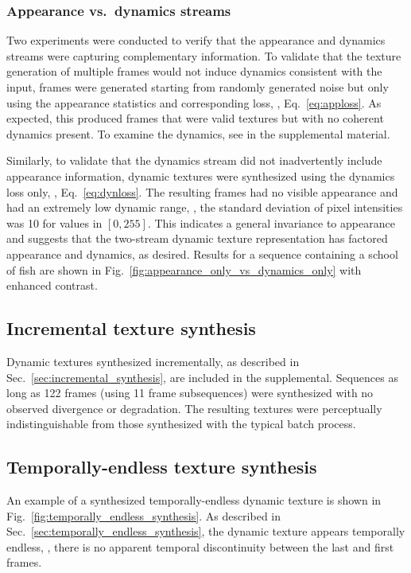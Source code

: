 \subsubsection{Appearance vs.\ dynamics streams}

Two experiments were conducted to verify that the appearance and dynamics
streams were capturing complementary information.
To validate that the texture generation of multiple frames
would not induce dynamics consistent with the input, frames were generated
starting from randomly generated noise but only using the
appearance statistics and corresponding loss, \ie,
Eq.\ \ref{eq:apploss}.
As expected, this produced frames that were valid textures but
with no coherent dynamics present.
To examine the dynamics, see 
 in the supplemental material.

Similarly, to validate that the dynamics stream did not 
inadvertently include appearance information, dynamic textures were synthesized
using the dynamics loss only, \ie, Eq.\ \ref{eq:dynloss}.
The resulting frames had no visible appearance and had
an extremely low dynamic range, \ie, the standard
deviation of pixel intensities was 10 for values in $[0,255]$.
This indicates a general invariance to appearance and 
suggests that the two-stream dynamic texture representation
has factored appearance and dynamics, as desired.
Results for a sequence containing a school of fish are shown in
Fig.\ \ref{fig:appearance_only_vs_dynamics_only} with enhanced contrast.



\subsection{Incremental texture synthesis}

Dynamic textures synthesized incrementally, as described in Sec.\
\ref{sec:incremental_synthesis}, are included in the supplemental.
Sequences as long as 122 frames (using 11 frame subsequences) were synthesized
with no observed divergence or degradation. The resulting textures were 
perceptually indistinguishable from those synthesized with the typical batch process.

\subsection{Temporally-endless texture synthesis}

An example of a synthesized temporally-endless dynamic texture is shown in
Fig.\ \ref{fig:temporally_endless_synthesis}. As described in Sec.\ 
\ref{sec:temporally_endless_synthesis}, the dynamic texture appears
temporally endless, \ie, there is no apparent temporal discontinuity between the last and first frames.

